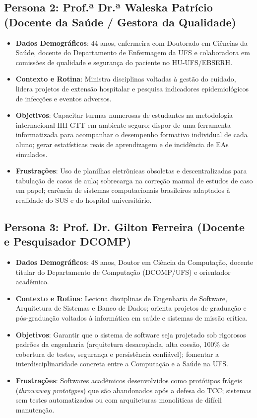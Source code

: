 \subsection{Persona 2: Prof.ª Dr.ª Waleska Patrício (Docente da Saúde / Gestora da Qualidade)}
\begin{itemize}
    \item \textbf{Dados Demográficos}: 44 anos, enfermeira com Doutorado em Ciências da Saúde, docente do Departamento de Enfermagem da UFS e colaboradora em comissões de qualidade e segurança do paciente no HU-UFS/EBSERH.
    \item \textbf{Contexto e Rotina}: Ministra disciplinas voltadas à gestão do cuidado, lidera projetos de extensão hospitalar e pesquisa indicadores epidemiológicos de infecções e eventos adversos.
    \item \textbf{Objetivos}: Capacitar turmas numerosas de estudantes na metodologia internacional IHI-GTT em ambiente seguro; dispor de uma ferramenta informatizada para acompanhar o desempenho formativo individual de cada aluno; gerar estatísticas reais de aprendizagem e de incidência de EAs simulados.
    \item \textbf{Frustrações}: Uso de planilhas eletrônicas obsoletas e descentralizadas para tabulação de casos de aula; sobrecarga na correção manual de estudos de caso em papel; carência de sistemas computacionais brasileiros adaptados à realidade do SUS e do hospital universitário.
\end{itemize}

\subsection{Persona 3: Prof. Dr. Gilton Ferreira (Docente e Pesquisador DCOMP)}
\begin{itemize}
    \item \textbf{Dados Demográficos}: 48 anos, Doutor em Ciência da Computação, docente titular do Departamento de Computação (DCOMP/UFS) e orientador acadêmico.
    \item \textbf{Contexto e Rotina}: Leciona disciplinas de Engenharia de Software, Arquitetura de Sistemas e Banco de Dados; orienta projetos de graduação e pós-graduação voltados à informática em saúde e sistemas de missão crítica.
    \item \textbf{Objetivos}: Garantir que o sistema de software seja projetado sob rigorosos padrões da engenharia (arquitetura desacoplada, alta coesão, 100\% de cobertura de testes, segurança e persistência confiável); fomentar a interdisciplinaridade concreta entre a Computação e a Saúde na UFS.
    \item \textbf{Frustrações}: Softwares acadêmicos desenvolvidos como protótipos frágeis (\textit{throwaway prototypes}) que são abandonados após a defesa do TCC; sistemas sem testes automatizados ou com arquiteturas monolíticas de difícil manutenção.
\end{itemize}


